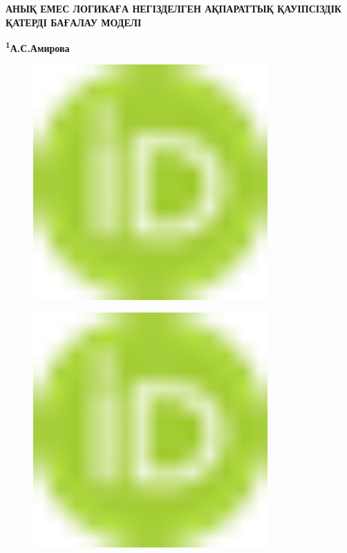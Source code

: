 
{\bfseries АНЫҚ ЕМЕС ЛОГИКАҒА НЕГІЗДЕЛГЕН АҚПАРАТТЫҚ ҚАУІПСІЗДІК ҚАТЕРДІ
БАҒАЛАУ МОДЕЛІ}

{\bfseries \textsuperscript{1}А.С.Амирова\textsuperscript{\envelope }}
\begin{figure}[H]
	\centering
	\includegraphics[width=0.8\textwidth]{media/ict/image1}
	\caption*{}
\end{figure}

\begin{figure}[H]
	\centering
	\includegraphics[width=0.8\textwidth]{media/ict/image1}
	\caption*{}
\end{figure}

